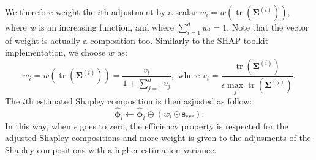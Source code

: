 \documentclass{article}
\theoremstyle{plain}
\theoremstyle{definition}
\theoremstyle{remark}
\DeclareMathOperator{\tr}{tr}
\begin{document}
We therefore weight the $i$th adjustment by a scalar $w_i = w\left(\tr\left(\bm{\Sigma}^{(i)}\right)\right)$, where $w$ is an increasing function, and where $\displaystyle \sum_{i=1}^d w_i= 1$. Note that the vector of weight is actually a composition too. Similarly to the SHAP toolkit implementation, we choose $w$ as:
\begin{equation}
  w_i = w\left(\tr\left(\bm{\Sigma}^{(i)}\right)\right) = \frac{v_i}{\displaystyle 1+\sum_{j=1}^{d}v_j},\text{ where } v_i = \frac{\tr\left(\bm{\Sigma}^{(i)}\right)}{\displaystyle \epsilon \max_j \tr\left(\bm{\Sigma}^{(j)}\right)}.
\end{equation}
The $i$th estimated Shapley composition is then asjusted as follow:
\begin{equation}
  \hat{\bm{\phi}}_i \leftarrow \hat{\bm{\phi}}_i \oplus \left( w_i \odot \bm{s}_{err}\right).
\end{equation}
In this way, when $\epsilon$ goes to zero, the efficiency property is respected for the adjusted Shapley compositions and more weight is given to the adjusments of the Shapley compositions with a higher estimation variance.
\end{document}
